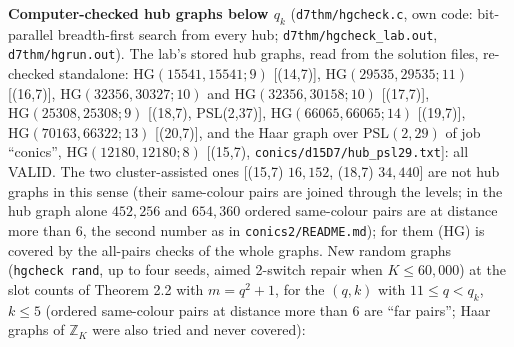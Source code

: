 \documentclass[
  10pt,
]{article}
\begin{document}
\textbf{Computer-checked hub graphs below \(q_k\)}
(\texttt{d7thm/hgcheck.c}, own code: bit-parallel breadth-first search
from every hub; \texttt{d7thm/hgcheck\_lab.out},
\texttt{d7thm/hgrun.out}). The lab's stored hub graphs, read from the
solution files, re-checked standalone: \(\mathrm{HG}(15541,15541;9)\)
{[}(14,7){]}, \(\mathrm{HG}(29535,29535;11)\) {[}(16,7){]},
\(\mathrm{HG}(32356,30327;10)\) and \(\mathrm{HG}(32356,30158;10)\)
{[}(17,7){]}, \(\mathrm{HG}(25308,25308;9)\) {[}(18,7), PSL(2,37){]},
\(\mathrm{HG}(66065,66065;14)\) {[}(19,7){]},
\(\mathrm{HG}(70163,66322;13)\) {[}(20,7){]}, and the Haar graph over
\(\mathrm{PSL}(2,29)\) of job ``conics'', \(\mathrm{HG}(12180,12180;8)\)
{[}(15,7), \texttt{conics/d15D7/hub\_psl29.txt}{]}: all VALID. The two
cluster-assisted ones {[}(15,7) \(16{,}152\), (18,7) \(34{,}440\){]} are
not hub graphs in this sense (their same-colour pairs are joined through
the levels; in the hub graph alone \(452{,}256\) and \(654{,}360\)
ordered same-colour pairs are at distance more than \(6\), the second
number as in \texttt{conics2/README.md}); for them (HG) is covered by
the all-pairs checks of the whole graphs. New random graphs
(\texttt{hgcheck\ rand}, up to four seeds, aimed 2-switch repair when
\(K\le60{,}000\)) at the slot counts of Theorem 2.2 with \(m=q^2+1\),
for the \((q,k)\) with \(11\le q<q_k\), \(k\le5\) (ordered same-colour
pairs at distance more than \(6\) are ``far pairs''; Haar graphs of
\(\mathbb Z_K\) were also tried and never covered):
\end{document}
